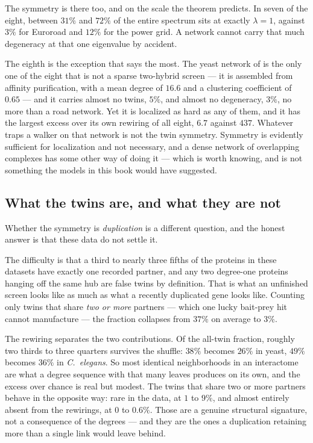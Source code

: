 The symmetry is there too, and on the scale the theorem predicts. In seven of the eight,
between $31\%$ and $72\%$ of the entire spectrum sits at exactly $\lambda=1$, against
$3\%$ for Euroroad and $12\%$ for the power grid. A network cannot carry that much
degeneracy at that one eigenvalue by accident.

The eighth is the exception that says the most. The yeast network of
\citet{collins2007} is the only one of the eight that is not a sparse two-hybrid
screen --- it is assembled from affinity purification, with a mean degree of $16.6$ and
a clustering coefficient of $0.65$ --- and it carries almost no twins, $5\%$, and almost
no degeneracy, $3\%$, no more than a road network. Yet it is localized as hard as any of
them, and it has the largest excess over its own rewiring of all eight, $6.7$ against
$437$. Whatever traps a walker on that network is not the twin symmetry. Symmetry is
evidently sufficient for localization and not necessary, and a dense network of
overlapping complexes has some other way of doing it --- which is worth knowing, and is
not something the models in this book would have suggested.

\subsection*{What the twins are, and what they are not}

Whether the symmetry is \emph{duplication} is a different question, and the honest
answer is that these data do not settle it.

The difficulty is that a third to nearly three fifths of the proteins in these
datasets have exactly one recorded partner, and any two degree-one proteins hanging
off the same hub are false twins by definition. That is what an unfinished screen
looks like as much as what a recently duplicated gene looks like. Counting only twins
that share \emph{two or more} partners --- which one lucky bait-prey hit cannot
manufacture --- the fraction collapses from $37\%$ on average to $3\%$.

The rewiring separates the two contributions. Of the all-twin fraction, roughly two
thirds to three quarters survives the shuffle: $38\%$ becomes $26\%$ in yeast, $49\%$
becomes $36\%$ in \emph{C.\ elegans}. So most identical neighborhoods in an
interactome are what a degree sequence with that many leaves produces on its own, and
the excess over chance is real but modest. The twins that share two or more partners
behave in the opposite way: rare in the data, at $1$ to $9\%$, and almost entirely
absent from the rewirings, at $0$ to $0.6\%$. Those are a genuine structural
signature, not a consequence of the degrees --- and they are the ones a duplication
retaining more than a single link would leave behind.

